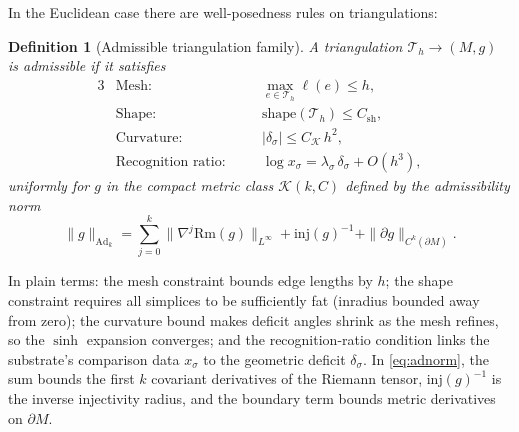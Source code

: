 \documentclass[11pt,letterpaper]{article}
\newtheorem{definition}[theorem]{Definition}
\begin{document}
In the Euclidean case there are well-posedness rules on triangulations:

\begin{definition}[Admissible triangulation family]
A triangulation $\mathcal{T}_{h}\to(M,g)$ is admissible if it satisfies
\begin{alignat}{3}
&\text{Mesh:} &\quad& \max_{e\in\mathcal{T}_{h}}\ell(e)\le h, \nonumber\\
&\text{Shape:} && \mathrm{shape}(\mathcal{T}_{h})\le C_{\mathrm{sh}}, \nonumber\\
&\text{Curvature:} && |\delta_{\sigma}|\le C_{\mathcal{K}}\,h^{2}, \nonumber\\
&\text{Recognition ratio:} && \log x_{\sigma}=\lambda_{\sigma}\,\delta_{\sigma}+O(h^{3}),
\label{eq:admissibility}
\end{alignat}
uniformly for $g$ in the compact metric class $\mathcal{K}(k,C)$ defined by the admissibility norm
\begin{equation}
\|g\|_{\mathrm{Ad}_{k}}=\sum_{j=0}^{k}\|\nabla^{j}\mathrm{Rm}(g)\|_{L^{\infty}}+\mathrm{inj}(g)^{-1}+\|\partial g\|_{C^{k}(\partial M)}.
\label{eq:adnorm}
\end{equation}
\end{definition}

In plain terms: the mesh constraint bounds edge lengths by $h$; the shape constraint requires all simplices to be sufficiently fat (inradius bounded away from zero); the curvature bound makes deficit angles shrink as the mesh refines, so the $\sinh$ expansion converges; and the recognition-ratio condition links the substrate's comparison data $x_{\sigma}$ to the geometric deficit $\delta_{\sigma}$. In \eqref{eq:adnorm}, the sum bounds the first $k$ covariant derivatives of the Riemann tensor, $\mathrm{inj}(g)^{-1}$ is the inverse injectivity radius, and the boundary term bounds metric derivatives on $\partial M$.
\end{document}
